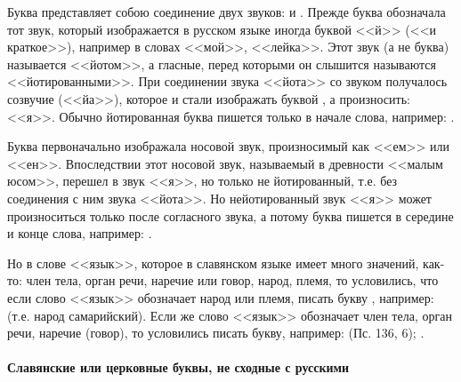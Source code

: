 \documentclass[11pt,a4paper,oneside]{memoir}
\newcommand{\exercise}{}
\begin{document}
        Буква {} представляет собою соединение двух звуков:
        {} и {}. Прежде буква {} обозначала
        тот звук, который изображается в русском языке иногда буквой
        <<й>> (<<и краткое>>), например в словах <<мой>>, <<лейка>>.
        Этот звук (а не буква) называется <<йотом>>, а гласные, перед
        которыми он слышится называются <<йотированными>>. При
        соединении звука <<йота>> со звуком {} получалось
        созвучие {} (<<йа>>), которое и стали изображать
        буквой {}, а произносить: <<я>>. Обычно йотированная
        буква {} пишется только в начале слова, например:
        {}.

        Буква {} первоначально изображала носовой звук,
        произносимый как <<ем>> или <<ен>>. Впоследствии этот носовой
        звук, называемый в древности <<малым юсом>>, перешел в звук
        <<я>>, но только не йотированный, т.е. без соединения с ним
        звука <<йота>>. Но нейотированный звук <<я>> может
        произноситься только после согласного звука, а потому буква
        {} пишется в середине и конце слова, например:
        {}.

        Но в слове <<язык>>, которое в славянском языке имеет много
        значений, как-то: член тела, орган речи, наречие или говор,
        народ, племя, то условились, что если слово <<язык>>
        обозначает народ или племя, писать букву {}, например:
        {} (т.е. народ самарийский). Если
        же слово <<язык>> обозначает член тела, орган речи, наречие
        (говор), то условились писать букву{}, например:
        {} (Пс. 136, 6);
        {}.

        \paragraph{\exercise}

        \textbf{Славянские или церковные буквы, не сходные с русскими}
\end{document}

